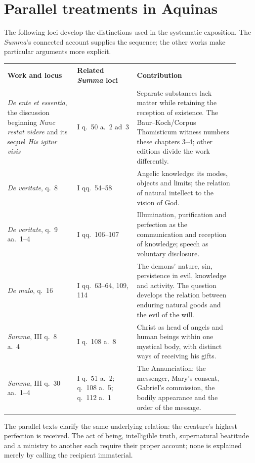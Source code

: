 \section{Parallel treatments in Aquinas}
\label{app:parallels}

The following loci develop the distinctions used in the systematic exposition.
The \emph{Summa}'s connected account supplies the sequence; the other works
make particular arguments more explicit.

\begin{longtable}{@{}>{\raggedright\arraybackslash}p{0.28\linewidth}>{\raggedright\arraybackslash}p{0.24\linewidth}>{\raggedright\arraybackslash}p{0.41\linewidth}@{}}
\toprule
Work and locus & Related \emph{Summa} loci & Contribution\\
\midrule\endhead
\emph{De ente et essentia}, the discussion beginning \emph{Nunc restat
videre} and its sequel \emph{His igitur visis} & I q.~50 a.~2 ad~3 &
Separate substances lack matter while retaining the reception of existence.
The Baur--Koch/Corpus Thomisticum witness numbers these chapters 3--4;
other editions divide the work differently.\\
\emph{De veritate}, q.~8 & I qq.~54--58 & Angelic knowledge: its modes,
objects and limits; the relation of natural intellect to the vision of God.\\
\emph{De veritate}, q.~9 aa.~1--4 & I qq.~106--107 & Illumination,
purification and perfection as the communication and reception of knowledge;
speech as voluntary disclosure.\\
\emph{De malo}, q.~16 & I qq.~63--64, 109, 114 & The demons' nature,
sin, persistence in evil, knowledge and activity. The question develops the
relation between enduring natural goods and the evil of the will.\\
\emph{Summa}, III q.~8 a.~4 & I q.~108 a.~8 & Christ as head of angels
and human beings within one mystical body, with distinct ways of receiving
his gifts.\\
\emph{Summa}, III q.~30 aa.~1--4 & I q.~51 a.~2;
q.~108 a.~5; q.~112 a.~1 & The Annunciation: the messenger, Mary's
consent, Gabriel's commission, the bodily appearance and the order of the message.\\
\bottomrule
\end{longtable}

The parallel texts clarify the same underlying relation: the creature's
highest perfection is received. The act of being, intelligible truth,
supernatural beatitude and a ministry to another each require their proper
account; none is explained merely by calling the recipient immaterial.

